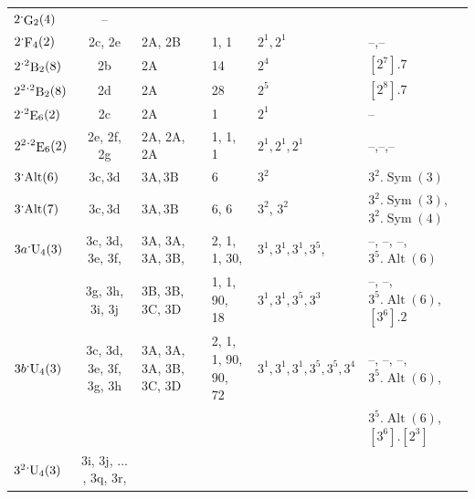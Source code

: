 \documentclass[11pt,a4paper]{amsart}
\theoremstyle{plain}
\theoremstyle{definition}
\theoremstyle{remark}
\theoremstyle{remark}
\theoremstyle{remark}
\theoremstyle{definition}
\newcommand{\ns}{\mathbin{\mspace{-4mu}\vcenter{\hbox{\raisebox{1ex}{$\cdot$}}}\mspace{-4mu}}}
\newcommand{\twist}[1]{%
  {}^{2}\!#1%
}
\DeclareMathOperator{\B}{B}
\DeclareMathOperator{\E}{E}
\DeclareMathOperator{\F}{F}
\DeclareMathOperator{\G}{G}
\DeclareMathOperator{\Alt}{Alt}
\DeclareMathOperator{\Sym}{Sym}
\begin{document}
\begin{table}
\begin{tabular}{|l|c|l|l|l|l|}
$2\ns\G_2(4)$                    & --                                    &                    &                  &             &        \\
$2\ns\F_4(2)$            & 2c, 2e            & 2A, 2B                                  & 1, 1                               & $2^1,2^1$              &--,--                  \\
$2\ns\twist\B_2(8)$        & 2b                                              & 2A                                              & 14                                       & $2^4$                     &$[2^7].7$                       \\
$2^2\ns\twist\B_2(8)$      & 2d                                              & 2A                                              & 28                                       & $2^5$                      &$[2^8].7$                      \\
$2\ns\twist\E_6(2)$        & 2c                                              & 2A                                              & 1                                        & $2^1$                &--                            \\
$2^2\ns\twist\E_6(2)$      & 2e, 2f, 2g                                      & 2A, 2A, 2A                                      & 1, 1, 1                                  & $2^1, 2^1, 2^1$        &--,--,--                          \\
$3\ns\mathrm{Alt}(6)$               & $\mathrm{3c,3d}$                                & $\mathrm{3A},\mathrm{3B}$                       & 6                                        & $3^2$             &$3^2.\Sym(3)$                               \\
$3\ns\mathrm{Alt}(7)$               & $\mathrm{3c,3d}$                                & $\mathrm{3A},\mathrm{3B}$                       & 6, 6                                        & $3^2$, $3^2$ &$3^2.\Sym(3)$, $3^2.\Sym(4)$                                            \\\hline
$3a\ns\mathrm{U}_4(3)$  & 3c, 3d, 3e, 3f,
                & 3A, 3A, 3A, 3B,
                  & 2, 1, 1, 30,
               & $3^1, 3^1, 3^1, 3^5$, &--, --, --, $3^5.\Alt(6)$
        \\&3g, 3h, 3i, 3j &3B, 3B, 3C, 3D &1, 1, 90, 18 &$3^1, 3^1, 3^5, 3^3$ &--, --,$3^5.\Alt(6)$, $[3^6].2$ \\\hline
$3b\ns\mathrm{U}_4(3)$  & 3c, 3d, 3e, 3f, 3g, 3h                          & 3A, 3A, 3A, 3B, 3C, 3D                          & 2, 1, 1, 90, 90, 72                      & $3^1, 3^1, 3^1, 3^5, 3^5, 3^4$     &--, --, --, $3^5.\Alt(6)$,\\&&&&&$3^5.\Alt(6)$, $[3^6].[2^3]$            \\\hline
$3^2\ns\mathrm{U}_4(3)$ & 3i, 3j, $\dots$, 3q, 3r, &


\end{tabular}
\end{table}
\end{document}
